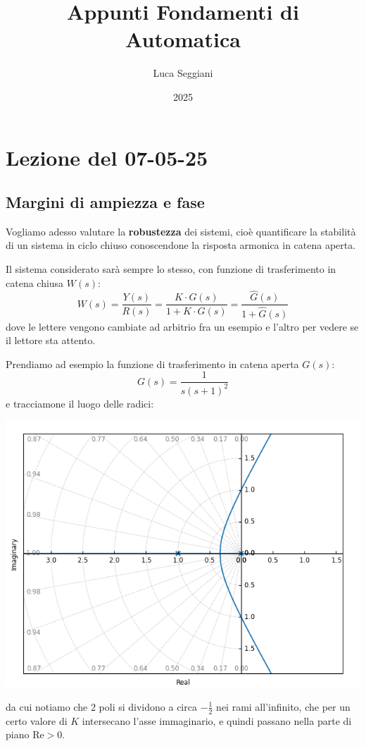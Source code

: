 \documentclass[a4paper,11pt]{article}
\title{Appunti Fondamenti di Automatica}
\author{Luca Seggiani}
\date{2025}
\begin{document}
\section{Lezione del 07-05-25}

\thispagestyle{empty}
\pagestyle{fancy}

\subsection{Margini di ampiezza e fase}
Vogliamo adesso valutare la \textbf{robustezza} dei sistemi, cioè quantificare la stabilità di un sistema in ciclo chiuso conoscendone la risposta armonica in catena aperta.

Il sistema considerato sarà sempre lo stesso, con funzione di trasferimento in catena chiusa $W(s)$:
$$
W(s) = \frac{Y(s)}{R(s)} = \frac{K \cdot G(s)}{1 + K \cdot G(s)} = \frac{\hat{G}(s)}{1 + \hat{G}(s)}
$$
dove le lettere vengono cambiate ad arbitrio fra un esempio e l'altro per vedere se il lettore sta attento.

Prendiamo ad esempio la funzione di trasferimento in catena aperta $G(s)$:
$$
G(s) = \frac{1}{s (s + 1)^2}
$$
e tracciamone il luogo delle radici:
\begin{center}
	\includegraphics[scale=0.7]{../figures/rlocus_margin.png}
\end{center}
da cui notiamo che 2 poli si dividono a circa $-\frac{1}{2}$ nei rami all'infinito, che per un certo valore di $K$ intersecano l'asse immaginario, e quindi passano nella parte di piano $\mathrm{Re} > 0$. 
\end{document}
